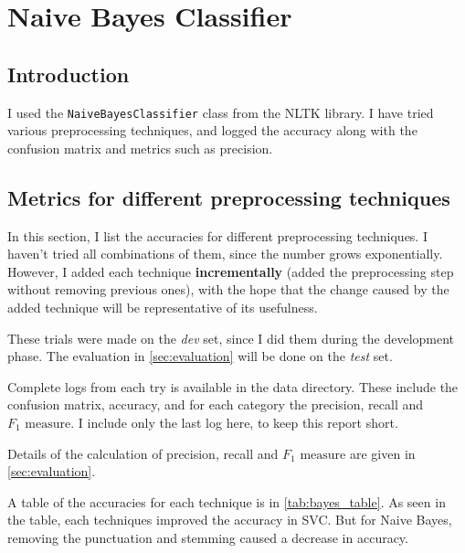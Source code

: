 \section{Naive Bayes Classifier}
\label{sec:bayes}

\subsection{Introduction}

I used the \texttt{NaiveBayesClassifier} class from the NLTK library. I have tried various preprocessing techniques, and logged the accuracy along with the confusion matrix and metrics such as precision.

\subsection{Metrics for different preprocessing techniques}

In this section, I list the accuracies for different preprocessing techniques. I haven't tried all combinations of them, since the number grows exponentially. However, I added each technique \textbf{incrementally} (added the preprocessing step without removing previous ones), with the hope that the change caused by the added technique will be representative of its usefulness.

These trials were made on the \emph{dev} set, since I did them during the development phase. The evaluation in \autoref{sec:evaluation} will be done on the \emph{test} set.

Complete logs from each try is available in the data directory. These include the confusion matrix, accuracy, and for each category the precision, recall and $F_1\text{ measure}$. I include only the last log here, to keep this report short.

Details of the calculation of precision, recall and $F_1\text{ measure}$ are given in \autoref{sec:evaluation}.

A table of the accuracies for each technique is in \autoref{tab:bayes_table}. As seen in the table, each techniques improved the accuracy in SVC. But for Naive Bayes, removing the punctuation and stemming caused a decrease in accuracy.

